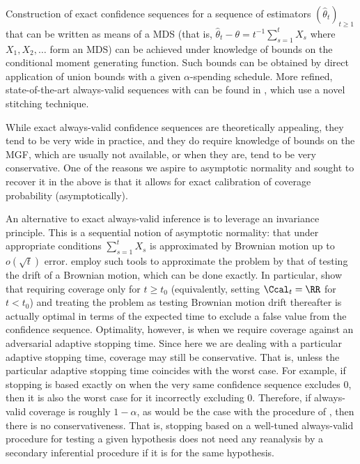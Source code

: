Construction of exact confidence sequences for a sequence of estimators $(\widehat{\theta}_t)_{t \geq 1}$ that can be written as means of a MDS (that is, $\widehat{\theta}_t-\theta = t^{-1} \sum_{s=1}^t X_s$ where $X_1,X_2,\dots$ form an MDS) can be achieved under knowledge of bounds on the conditional moment generating function. Such bounds can be obtained by direct application of union bounds with a given $\alpha$-spending schedule. More refined, state-of-the-art always-valid sequences with can be found in \cite{howard2021time}, which use a novel stitching technique.

While exact always-valid confidence sequences are theoretically appealing, they tend to be very wide in practice, and they do require knowledge of bounds on the MGF, which are usually not available, or when they are, tend to be very conservative. One of the reasons we aspire to asymptotic normality and sought to recover it in the above is that it allows for exact calibration of coverage probability (asymptotically).

An alternative to exact always-valid inference is to leverage an invariance principle. This is a sequential notion of asymptotic normality: that under appropriate conditions $\sum_{s=1}^t X_s$ is approximated by Brownian motion up to $o(\sqrt{t})$ error. \citet{bibaut2022near,waudby2021time} employ such tools to approximate the problem by that of testing the drift of a Brownian motion, which can be done exactly. In particular, \citet{bibaut2022near} show that requiring coverage only for $t\geq t_0$ (equivalently, setting $\Ccal_t=\RR$ for $t<t_0$) and treating the problem as testing Brownian motion drift thereafter is actually optimal in terms of the expected time to exclude a false value from the confidence sequence. Optimality, however, is when we require coverage against an adversarial adaptive stopping time. Since here we are dealing with a particular adaptive stopping time, coverage may still be conservative. That is, unless the particular adaptive stopping time coincides with the worst case. For example, if stopping is based exactly on when the very same confidence sequence excludes $0$, then it is also the worst case for it incorrectly excluding $0$. Therefore, if always-valid coverage is roughly $1-\alpha$, as would be the case with the procedure of \citet{bibaut2022near}, then there is no conservativeness. That is, stopping based on a well-tuned always-valid procedure for testing a given hypothesis does not need any reanalysis by a secondary inferential procedure if it is for the same hypothesis.




